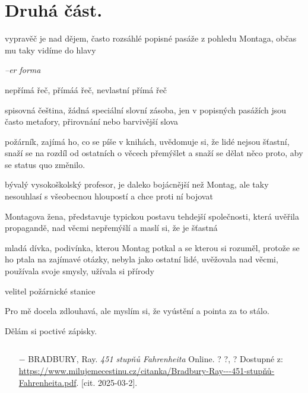 \documentclass{article}
\begin{document}
\section{Druhá část.}
\begin{description}
    \setlength\itemsep{0.15em}
    \item[vypravěč:] vypravěč je nad dějem, často rozsáhlé popisné pasáže z pohledu Montaga, občas mu taky vidíme do hlavy
    \item[vyprávěcí způsoby:] \textit{--er forma}
    \item[typy promluv:] nepřímá řeč, přímáá řeč, nevlastní přímá řeč
    \item[jazyková stránka:] spisovná čeština, žádná speciální slovní zásoba, jen v popisných pasážích jsou často metafory, přirovnání nebo barvivější slova
    \item[postavy:]
        \begin{description}
            \setlength\itemsep{0.15em}
      		\item[Guy Montag,] požárník, zajímá ho, co se píše v knihách, uvědomuje si, že lidé nejsou šťastní, snaží se na rozdíl od ostatních o věcech přemýšlet a snaží se dělat něco proto, aby se status quo změnilo.
       	    \item[Faber,] bývalý vysokoškolský profesor, je daleko bojácnější než Montag, ale taky nesouhlasí s všeobecnou hloupostí a chce proti ní bojovat
         	\item[Mildred,] Montagova žena, představuje typickou postavu tehdejší společnosti, která uvěřila propagandě, nad věcmi nepřemýšlí a maslí si, že je šťastná
         	\item[Clarissa McClellanová,] mladá dívka, podivínka, kterou Montag potkal a se kterou si rozuměl, protože se ho ptala na zajímavé otázky, nebyla jako ostatní lidé, uvěžovala nad věcmi, používala svoje smysly, užívala si přírody
         	\item[Beatty,] velitel požárnické stanice
        \end{description}
    \item[názor:] Pro mě docela zdlouhavá, ale myslím si, že vyústění a pointa za to stálo.
    \item[kontext:]  Dělám si poctivé zápisky.
    \item[zdroje:] $ $
    \begin{itemize}
        \setlength\itemsep{0em}
        \item[$-$] BRADBURY, Ray. \textit{451 stupňů Fahrenheita} Online. ? ?, ? Dostupné z: \url{https://www.milujemecestinu.cz/citanka/Bradbury-Ray---451-stupňů-Fahrenheita.pdf}. [cit. 2025-03-2].
    \end{itemize}
\end{description}
\end{document}
